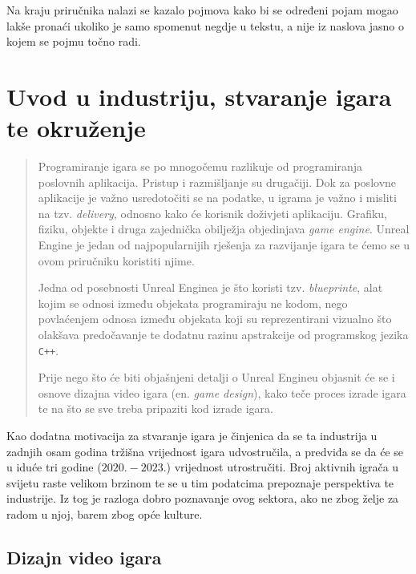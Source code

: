 \documentclass[a4paper,10pt]{article}
\begin{document}
Na kraju priručnika nalazi se kazalo pojmova kako bi se određeni pojam mogao
lakše pronaći ukoliko je samo spomenut negdje u tekstu, a nije iz naslova jasno
o kojem se pojmu točno radi.

\pagebreak

\section{Uvod u industriju, stvaranje igara te okruženje}

\begin{quote}
	\small
	Programiranje igara se po mnogočemu razlikuje od programiranja
	poslovnih aplikacija. Pristup i razmišljanje su drugačiji. Dok za
	poslovne aplikacije je važno usredotočiti se na podatke, u igrama je
	važno i misliti na tzv. \textit{delivery}, odnosno kako će korisnik
	doživjeti aplikaciju. Grafiku, fiziku, objekte i druga zajednička
	obilježja objedinjava \textit{game engine}. Unreal Engine je jedan od
	najpopularnijih rješenja za razvijanje igara te ćemo se u ovom
	priručniku koristiti njime.

	Jedna od posebnosti Unreal Enginea je što koristi tzv.
	\textit{blueprinte}, alat kojim se odnosi između objekata programiraju
	ne kodom, nego povlaćenjem odnosa između objekata koji su
	reprezentirani vizualno što olakšava predočavanje te dodatnu razinu
	apstrakcije od programskog jezika \texttt{C++}.

	Prije nego što će biti objašnjeni detalji o Unreal Engineu objasnit će
	se i osnove dizajna video igara (en. \textit{game design}), kako teče
	proces izrade igara te na što se sve treba pripaziti kod izrade igara.
\end{quote}

Kao dodatna motivacija za stvaranje igara je činjenica da se ta industrija u
zadnjih osam godina tržišna vrijednost igara udvostručila, a predviđa se da će
se u iduće tri godine ($2020.-2023.$) vrijednost utrostručiti. Broj aktivnih
igrača u svijetu raste velikom brzinom te se u tim podatcima prepoznaje
perspektiva te industrije. Iz tog je razloga dobro poznavanje ovog sektora, ako
ne zbog želje za radom u njoj, barem zbog opće kulture.

\subsection{Dizajn video igara}
\end{document}
